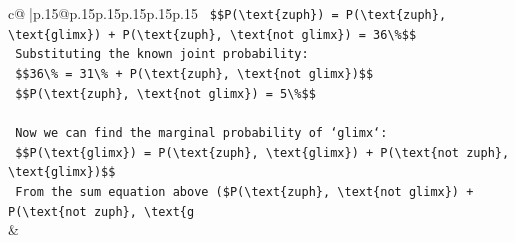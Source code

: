 \documentclass{article}
\begin{document}
{\begin{supertabular}{c@{$\;$}|p{.15\linewidth}@{}p{.15\linewidth}p{.15\linewidth}p{.15\linewidth}p{.15\linewidth}p{.15\linewidth}}
{{{\texttt{    \$\$P(\textbackslash{}text\{zuph\}) = P(\textbackslash{}text\{zuph\}, \textbackslash{}text\{glimx\}) + P(\textbackslash{}text\{zuph\}, \textbackslash{}text\{not glimx\}) = 36\textbackslash{}\%\$\$} \\
\texttt{    Substituting the known joint probability:} \\
\texttt{    \$\$36\textbackslash{}\% = 31\textbackslash{}\% + P(\textbackslash{}text\{zuph\}, \textbackslash{}text\{not glimx\})\$\$} \\
\texttt{    \$\$P(\textbackslash{}text\{zuph\}, \textbackslash{}text\{not glimx\}) = 5\textbackslash{}\%\$\$} \\
\\ 
\texttt{    Now we can find the marginal probability of `glimx`:} \\
\texttt{    \$\$P(\textbackslash{}text\{glimx\}) = P(\textbackslash{}text\{zuph\}, \textbackslash{}text\{glimx\}) + P(\textbackslash{}text\{not zuph\}, \textbackslash{}text\{glimx\})\$\$} \\
\texttt{    From the sum equation above (\$P(\textbackslash{}text\{zuph\}, \textbackslash{}text\{not glimx\}) + P(\textbackslash{}text\{not zuph\}, \textbackslash{}text\{g} \\
            }
        }
    }
    & \\ \\


\end{supertabular}}
\end{document}
